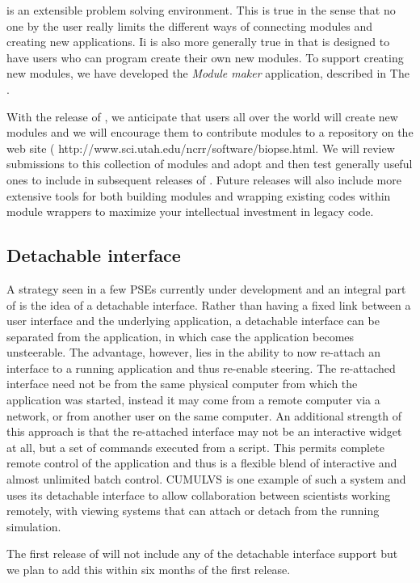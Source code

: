 \SR{} is an extensible  problem solving environment.
This is true in the sense that no one by the user really limits the
different ways of connecting modules and creating new applications.  Ii is
also more generally true in that \SR{} is designed to have users who can
program create their own new modules.  To support creating new modules, we
have developed the \emph{Module maker} application, described in The
.

With the release of \SR{}, we anticipate that users all over the world will
create new modules and we will encourage them to contribute modules to a
repository on the \PSE{} web site 
(
{http://www.sci.utah.edu/ncrr/software/biopse.html}.  We will review
submissions to this collection of modules and adopt and then test generally
useful ones to include in subsequent releases of \PSE{}.  Future releases
will also include more extensive tools for both building modules and
wrapping existing codes within \SR{} module wrappers to maximize your
intellectual investment in legacy code.


\subsection{Detachable interface}
\label{sec:con-detach} 

A strategy seen in a few PSEs currently under development and an integral
part of \SR{} is the idea of a detachable interface.  Rather than having a
fixed link between a user interface and the underlying application, a
detachable interface can be separated from the application, in which case
the application becomes unsteerable.  The advantage, however, lies in the
ability to now re-attach an interface to a running application and thus
re-enable steering.  The re-attached interface need not be from the same
physical computer from which the application was started, instead it may
come from a remote computer via a network, or from another user on the same
computer.  An additional strength of this approach is that the re-attached
interface may not be an interactive widget at all, but a set of commands
executed from a script.  This permits complete remote control of the
application and thus is a flexible blend of interactive and almost
unlimited batch control.  CUMULVS  is one example of such a
system and uses its detachable interface to allow collaboration between
scientists working remotely, with viewing systems that can attach or detach
from the running simulation.

The first release of \SR{} will not include any of the detachable interface
support but we plan to add this within six months of the first release.

